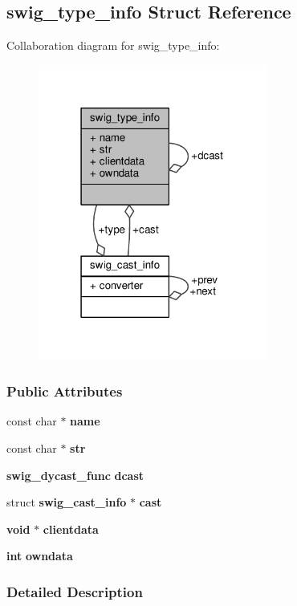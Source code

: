\subsection{swig\+\_\+type\+\_\+info Struct Reference}
\label{structswig__type__info}


Collaboration diagram for swig\+\_\+type\+\_\+info\+:
\nopagebreak
\begin{figure}[H]
\begin{center}
\leavevmode
\includegraphics[width=214pt]{d6/d39/structswig__type__info__coll__graph}
\end{center}
\end{figure}
\subsubsection*{Public Attributes}
\begin{DoxyCompactItemize}
\item 
const char $\ast$ {\bf name}
\item 
const char $\ast$ {\bf str}
\item 
{\bf swig\+\_\+dycast\+\_\+func} {\bf dcast}
\item 
struct {\bf swig\+\_\+cast\+\_\+info} $\ast$ {\bf cast}
\item 
{\bf void} $\ast$ {\bf clientdata}
\item 
{\bf int} {\bf owndata}
\end{DoxyCompactItemize}


\subsubsection{Detailed Description}



